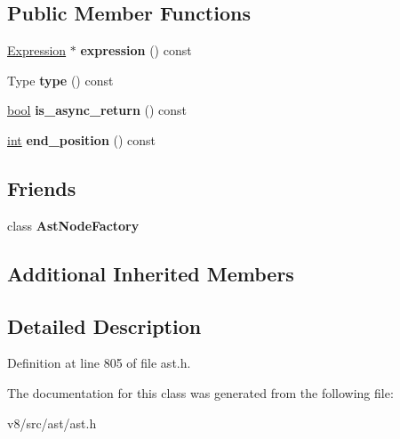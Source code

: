\subsection*{Public Member Functions}
\begin{DoxyCompactItemize}
\item 
\mbox{\label{classv8_1_1internal_1_1ReturnStatement_a891568d43de201e4df67bdde91e11221}} 
\mbox{\hyperlink{classv8_1_1internal_1_1Expression}{Expression}} $\ast$ {\bfseries expression} () const
\item 
\mbox{\label{classv8_1_1internal_1_1ReturnStatement_a9141521ad4f9234c9953c383d8970faa}} 
Type {\bfseries type} () const
\item 
\mbox{\label{classv8_1_1internal_1_1ReturnStatement_aa80a15ca1bd910ae41135d53713afe15}} 
\mbox{\hyperlink{classbool}{bool}} {\bfseries is\+\_\+async\+\_\+return} () const
\item 
\mbox{\label{classv8_1_1internal_1_1ReturnStatement_a3e56ccd188713bce1e6b1b9d2160e6a2}} 
\mbox{\hyperlink{classint}{int}} {\bfseries end\+\_\+position} () const
\end{DoxyCompactItemize}
\subsection*{Friends}
\begin{DoxyCompactItemize}
\item 
\mbox{\label{classv8_1_1internal_1_1ReturnStatement_a8d587c8ad3515ff6433eb83c578e795f}} 
class {\bfseries Ast\+Node\+Factory}
\end{DoxyCompactItemize}
\subsection*{Additional Inherited Members}


\subsection{Detailed Description}


Definition at line 805 of file ast.\+h.



The documentation for this class was generated from the following file\+:\begin{DoxyCompactItemize}
\item 
v8/src/ast/ast.\+h\end{DoxyCompactItemize}
